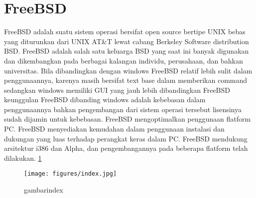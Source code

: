﻿%
\section{FreeBSD}
	FreeBSD adalah suatu sistem operasi bersifat open source bertipe UNIX bebas yang diturunkan dari UNIX AT\&T lewat cabang Berkeley Software distribution
	BSD. FreeBSD adalah salah satu keluarga BSD yang saat ini banyak digunakan dan dikembangkan pada berbagai kalangan individu,
	perusahaan, dan bahkan universitas. Bila dibandingkan dengan windows FreeBSD relatif lebih sulit dalam penggunaannya, karenya masih bersifat text base
	dalam memberikan command sedangkan windows memiliki GUI yang jauh lebih dibandingkan FreeBSD keunggulan FreeBSD dibanding windows
	adalah kebebasan dalam penggunaannya bahkan pengembangan dari sistem operasi tersebut lisensinya sudah dijamin untuk kebebasan.
	FreeBSD mengoptimalkan penggunaan flatform PC. FreeBSD menyediakan kemudahan dalam penggunaan instalasi dan dukungan yang luas terhadap perangkat keras dalam PC.
	FreeBSD mendukung arsitektur i386 dan Alpha, dan pengembangannya pada beberapa flatform telah dilakukan.
	\ref{index} 
	\begin{figure} [ht]
	\centerline{\texttt{[image: figures/index.jpg]}}
	\caption{gambarindex}
	\label {index}
	\end {figure}
